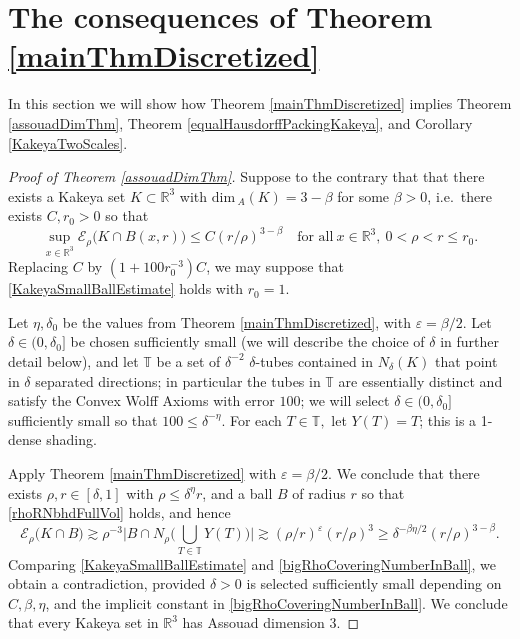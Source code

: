 \documentclass[letterpaper, reqno,11pt]{article}
\numberwithin{equation}{section}
\renewcommand{\dim}{\mathrm{dim}\,}
\newcommand{\RR}{\mathbb{R}}
\newcommand{\eps}{\varepsilon}
\newcommand{\tubes}{\mathbb{T}}
\newcommand{\dimA}{\dim_{\! \!A}}
\numberwithin{thm}{section}
\theoremstyle{remark}
\begin{document}
\section{The consequences of Theorem \ref{mainThmDiscretized}}\label{proofOfAssouadDimThmSec}
In this section we will show how Theorem \ref{mainThmDiscretized} implies Theorem \ref{assouadDimThm}, Theorem \ref{equalHausdorffPackingKakeya}, and Corollary \ref{KakeyaTwoScales}.

\begin{proof}[Proof of Theorem \ref{assouadDimThm}] 
Suppose to the contrary that that there exists a Kakeya set $K\subset\RR^3$ with $\dimA(K)=3-\beta$ for some $\beta>0$, i.e.~there exists $C,r_0>0$ so that
\begin{equation}\label{KakeyaSmallBallEstimate}
\sup_{x\in \RR^3} \mathcal{E}_{\rho}\big( K \cap B(x,r)\big)\leq C(r/\rho)^{3-\beta}\quad\textrm{for all}\ x\in\RR^3,\ 0<\rho<r\leq r_0. 
\end{equation}
Replacing $C$ by $(1 +100r_0^{-3})C$, we may suppose that \eqref{KakeyaSmallBallEstimate} holds with $r_0=1$. 


Let $\eta,\delta_0$ be the values from Theorem \ref{mainThmDiscretized}, with $\eps=\beta/2$. Let $\delta\in (0,\delta_0]$ be chosen sufficiently small (we will describe the choice of $\delta$ in further detail below), and let $\tubes$ be a set of $\delta^{-2}$ $\delta$-tubes contained in $N_{\delta}(K)$ that point in $\delta$ separated directions; in particular the tubes in $\tubes$ are essentially distinct and satisfy the Convex Wolff Axioms with error $100$; we will select $\delta\in (0,\delta_0]$ sufficiently small so that $100\leq\delta^{-\eta}$. For each $T\in\tubes,$ let $Y(T)=T$; this is a 1-dense shading. 

Apply Theorem \ref{mainThmDiscretized} with $\eps=\beta/2$. We conclude that there exists $\rho,r\in [\delta,1]$ with $\rho\leq\delta^{\eta}r$, and a ball $B$ of radius $r$ so that \eqref{rhoRNbhdFullVol} holds, and hence
\begin{equation}\label{bigRhoCoveringNumberInBall}
\mathcal{E}_{\rho}\big( K \cap B\big)\gtrsim \rho^{-3}\Big| B \cap N_{\rho}\Big(\bigcup_{T\in\tubes}Y(T)\Big)\Big| \gtrsim (\rho/r)^{\eps} (r/\rho)^3\geq \delta^{-\beta\eta/2}(r/\rho)^{3-\beta}. 
\end{equation}
Comparing \eqref{KakeyaSmallBallEstimate} and \eqref{bigRhoCoveringNumberInBall}, we obtain a contradiction, provided $\delta>0$ is selected sufficiently small depending on $C,\beta,\eta$, and the implicit constant in \eqref{bigRhoCoveringNumberInBall}. We conclude that every Kakeya set in $\RR^3$ has Assouad dimension 3. 
\end{proof}
\end{document}
